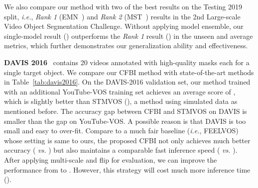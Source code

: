\documentclass[runningheads]{llncs}
\def\ie{\emph{i.e.}}
\begin{document}
We also compare our method with two of the best results on the Testing 2019 split, \ie, \textit{Rank 1} (EMN~\cite{emn}) and \textit{Rank 2} (MST~\cite{mst}) results in the 2nd Large-scale Video Object Segmentation Challenge. Without applying model ensemble, our single-model result () outperforms the \textit{Rank 1} result () in the unseen and average metrics, which further demonstrates our generalization ability and effectiveness.






\noindent \textbf{DAVIS 2016}~\cite{davis2016} contains 20 videos annotated with high-quality masks each for a single target object. We compare our CFBI method with state-of-the-art methods in Table~\ref{tab:davis2016}. On the DAVIS-2016 validation set, our method trained with an additional YouTube-VOS training set achieves an average score of , which is slightly better than STMVOS (), a method using simulated data as mentioned before. The accuracy gap between CFBI and STMVOS on DAVIS is smaller than the gap on YouTube-VOS. A possible reason is that DAVIS is too small and easy to over-fit.
Compare to a much fair baseline (\ie, FEELVOS) whose setting is same to ours, the proposed CFBI not only achieves much better accuracy ( \emph{vs.}\hspace{-0.8mm} ) but also maintains a comparable fast inference speed ( \emph{vs.}\hspace{-0.8mm} ). After applying multi-scale and flip for evaluation, we can improve the performance from  to . However, this strategy will cost much more inference time ().
\end{document}
